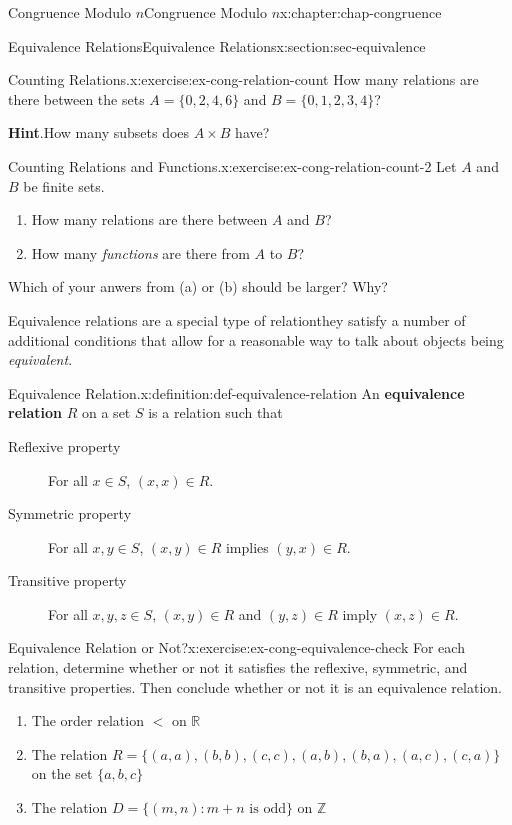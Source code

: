 \documentclass[oneside,10pt,]{book}
\newcommand{\blocktitlefont}{\relax}
\newcommand{\terminology}[1]{\textbf{#1}}
\numberwithin{equation}{section}
\newcommand{\lt}{<}
\begin{document}
\begin{chapterptx}{Congruence Modulo \(n\)}{}{Congruence Modulo \(n\)}{}{}{x:chapter:chap-congruence}
\begin{sectionptx}{Equivalence Relations}{}{Equivalence Relations}{}{}{x:section:sec-equivalence}
\begin{inlineexercise}{Counting Relations.}{x:exercise:ex-cong-relation-count}
How many relations are there between the sets \(A = \{0,2,4,6\}\) and \(B = \{0,1,2,3,4\}\)?%
\par\smallskip%
\noindent\textbf{\blocktitlefont Hint}.\hypertarget{g:hint:id482143}{}\quad{}How many subsets does \(A \times B\) have?%
\end{inlineexercise}
\begin{inlineexercise}{Counting Relations and Functions.}{x:exercise:ex-cong-relation-count-2}%
Let \(A\) and \(B\) be finite sets.%
\begin{enumerate}[label=(\alph*)]
\item{}How many relations are there between \(A\) and \(B\)?%
\item{}How many \emph{functions} are there from \(A\) to \(B\)?%
\end{enumerate}
Which of your anwers from (a) or (b) should be larger? Why?%
\end{inlineexercise}
Equivalence relations are a special type of relation\textemdash{}they satisfy a number of additional conditions that allow for a reasonable way to talk about objects being \emph{equivalent}.%
\begin{definition}{Equivalence Relation.}{x:definition:def-equivalence-relation}%
An \terminology{equivalence relation} \(R\) on a set \(S\) is a relation such that%
\begin{description}
\item[{Reflexive property}]For all \(x \in S\), \((x,x) \in R\).%
\item[{Symmetric property}]For all \(x, y \in S\), \((x,y) \in R\) implies \((y,x) \in R\).%
\item[{Transitive property}]For all \(x, y, z \in S\), \((x,y) \in R\) and \((y,z) \in R\) imply \((x,z) \in R\).%
\end{description}
%
\end{definition}
\begin{inlineexercise}{Equivalence Relation or Not?}{x:exercise:ex-cong-equivalence-check}%
For each relation, determine whether or not it satisfies the reflexive, symmetric, and transitive properties. Then conclude whether or not it is an equivalence relation.%
\begin{enumerate}[label=(\alph*)]
\item{}The order relation \(\lt\) on \(\mathbb{R}\)%
\item{}The relation \(R = \{(a,a),(b,b),(c,c),(a,b),(b,a),(a,c),(c,a)\}\) on the set \(\{a,b,c\}\)%
\item{}The relation \(D = \{(m,n): m + n \text{ is odd} \}\) on \(\mathbb{Z}\)%

\end{enumerate}
\end{inlineexercise}
\end{sectionptx}
\end{chapterptx}
\end{document}
